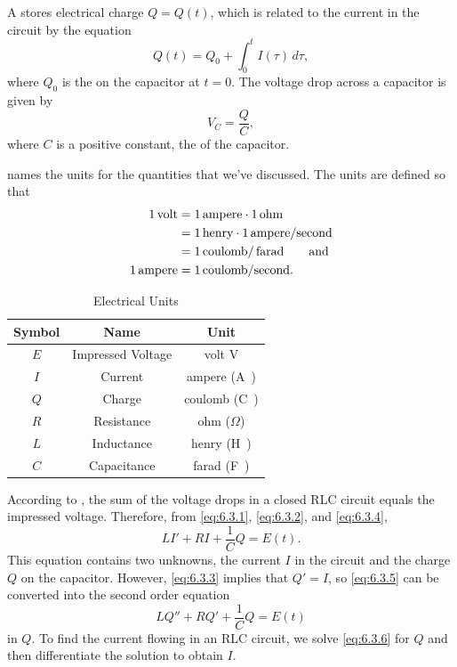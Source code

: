 A  stores electrical charge $Q=Q(t)$, which is related to
the current in the circuit by the equation
\begin{equation} \label{eq:6.3.3}
Q(t)=Q_0+\int_0^tI(\tau)\,d\tau,
\end{equation}
where $Q_0$ is the  on the capacitor at $t=0$. The voltage drop
across a capacitor is given by
\begin{equation} \label{eq:6.3.4}
V_C=\frac{Q}{C},
\end{equation}
where $C$ is a positive constant, the  of the
capacitor.

 names the units for the quantities that we've
discussed. The units are defined so that
\begin{align*}
1\text{\,volt}&=1\text{\,ampere}\cdot1\text{\,ohm}\\
&=1\text{\,henry}\cdot1\,\text{ampere}/\text{second}\\
&=1\text{\,coulomb}/\text{\,farad}\qquad\text{and}\\
1\text{\,ampere}&=1\text{\,coulomb}/\text{second}.
\end{align*}

\begin{table}
\caption{Electrical Units}
\label{table:6.3.1}
\centering
{}
\begin{tabular}{ccc}\toprule
Symbol&Name&Unit\\\midrule
$E$  &  Impressed Voltage & volt \unit\volt  \\
$I$ & Current & ampere (\unit\ampere)\\
$Q$ & Charge & coulomb (\unit\coulomb)\\
$R$ & Resistance& ohm (\(\Omega\))\\
$L$ & Inductance& henry (\unit\henry)\\
$C$ & Capacitance&farad (\unit\farad)\\
\bottomrule
\end{tabular}
\end{table}



According to
, the sum of
the voltage drops in a closed RLC circuit equals the impressed
voltage. Therefore, from \eqref{eq:6.3.1}, \eqref{eq:6.3.2}, and \eqref{eq:6.3.4},
\begin{equation}\label{eq:6.3.5}
 LI'+RI+\frac{1}{C}Q=E(t).
\end{equation}
This equation contains two unknowns, the current $I$ in the
circuit and the charge $Q$ on the capacitor. However, \eqref{eq:6.3.3}
implies that $Q'=I$, so \eqref{eq:6.3.5} can be converted into the second
order equation
\begin{equation} \label{eq:6.3.6}
 LQ''+RQ'+\frac{1}{C}Q=E(t)
\end{equation}
in $Q$. To find the current flowing in an RLC circuit, we solve
\eqref{eq:6.3.6} for $Q$ and then differentiate the solution to obtain
$I$.

